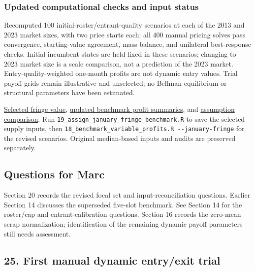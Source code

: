 \documentclass[10pt,]{article}
\begin{document}
\subsubsection{Updated computational checks and input
status}\label{updated-computational-checks-and-input-status}

Recomputed 100 initial-roster/entrant-quality scenarios at each of the
2013 and 2023 market sizes, with two price starts each: all 400 manual
pricing solves pass convergence, starting-value agreement, mass balance,
and unilateral best-response checks. Initial incumbent states are held
fixed in these scenarios; changing to 2023 market size is a scale
comparison, not a prediction of the 2023 market. Entry-quality-weighted
one-month profits are not dynamic entry values. Trial payoff grids
remain illustrative and unselected; no Bellman equilibrium or structural
parameters have been estimated.

\href{../../output/dynamic_entry_exit/january_fringe_benchmark_2026-11-06/constant_fringe_utility.csv}{Selected
fringe value},
\href{../../output/dynamic_entry_exit/benchmark_profits_january_fringe_2026-11-06/weighted_profit_summary.csv}{updated
benchmark profit summaries}, and
\href{../../output/dynamic_entry_exit/benchmark_profits_january_fringe_2026-11-06/initial_profit_assumption_comparison.csv}{assumption
comparison}. Run \texttt{19\_assign\_january\_fringe\_benchmark.R} to
save the selected supply inputs, then
\texttt{18\_benchmark\_variable\_profits.R\ -\/-january-fringe} for the
revised scenarios. Original median-based inputs and audits are preserved
separately.

\subsection{Questions for Marc}\label{questions-for-marc-1}

Section 20 records the revised focal set and input-reconciliation
questions. Earlier Section 14 discusses the superseded five-slot
benchmark. See Section 14 for the roster/cap and entrant-calibration
questions. Section 16 records the zero-mean scrap normalization;
identification of the remaining dynamic payoff parameters still needs
assessment.

\subsection{25. First manual dynamic entry/exit
trial}\label{first-manual-dynamic-entryexit-trial}
\end{document}
